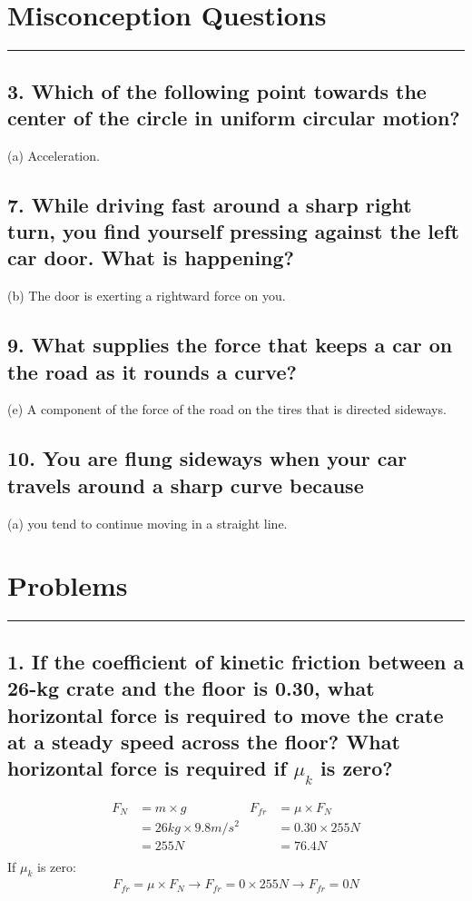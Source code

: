 \documentclass[12pt,a4paper,english]{article}
\begin{document}
\begin{flushleft}
  \section*{Misconception Questions}
  \hrule
  \subsection{3. Which of the following point towards the center of the circle in uniform circular motion?}
  (a) Acceleration.
  \subsection{7. While driving fast around a sharp right turn, you find yourself pressing against the left car door. What is happening?}
  (b) The door is exerting a rightward force on you.
  \subsection{9. What supplies the force that keeps a car on the road as it rounds a curve?}
  (e) A component of the force of the road on the tires that is directed sideways.
  \subsection{10. You are flung sideways when your car travels around a sharp curve because }
  (a) you tend to continue moving in a straight line.
  \section*{Problems}
  \hrule
  \subsection{1. If the coefficient of kinetic friction between a 26-kg crate and the floor is 0.30, what horizontal force is required to move the crate at a steady speed across the floor? What horizontal force is required if $\mu_k$ is zero?}
  \begin{align*}
    F_N&=m\times g
       &F_{fr}&=\mu \times F_N 
     \\
     &=26kg\times9.8m/s^2&&=0.30\times 255N
     \\
     &=255N&&=76.4N
     \\
  \end{align*}
  If $\mu_k$ is zero:
  \begin{align*}
    F_{fr}=\mu \times F_N \rightarrow
    F_{fr}=0\times 255N \rightarrow
    F_{fr}=0N
  \end{align*}

\end{flushleft}
\end{document}
